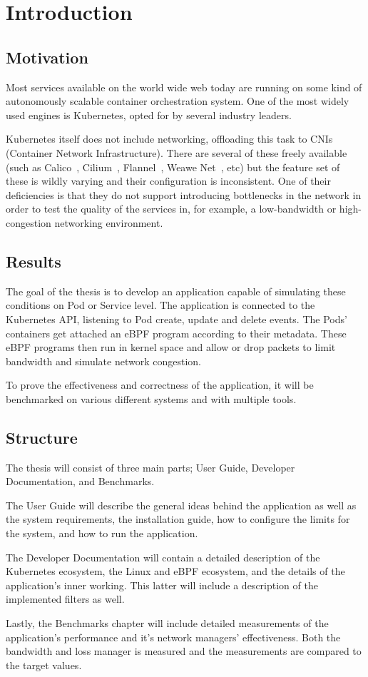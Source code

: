 \chapter{Introduction} %
\label{ch:intro}

\section{Motivation}
Most services available on the world wide web today are running on some kind of autonomously scalable container orchestration system. One of the most widely used engines is Kubernetes, opted for by several industry leaders.

Kubernetes itself does not include networking, offloading this task to CNIs (Container Network Infrastructure). There are several of these freely available (such as Calico~\cite{calico}, Cilium~\cite{cilium}, Flannel~\cite{flannel}, Weawe Net~\cite{weavenet}, etc) but the feature set of these is wildly varying and their configuration is inconsistent. One of their deficiencies is that they do not support introducing bottlenecks in the network in order to test the quality of the services in, for example, a low-bandwidth or high-congestion networking environment.

\section{Results}
The goal of the thesis is to develop an application capable of simulating these conditions on Pod or Service level. The application is connected to the Kubernetes API, listening to Pod create, update and delete events. The Pods' containers get attached an eBPF program according to their metadata. These eBPF programs then run in kernel space and allow or drop packets to limit bandwidth and simulate network congestion.

To prove the effectiveness and correctness of the application, it will be benchmarked on various different systems and with multiple tools.

\section{Structure}
The thesis will consist of three main parts; User Guide, Developer Documentation, and Benchmarks.
\bigbreak

The User Guide will describe the general ideas behind the application as well as the system requirements, the installation guide, how to configure the limits for the system, and how to run the application.
\bigbreak

The Developer Documentation will contain a detailed description of the Kubernetes ecosystem, the Linux and eBPF ecosystem, and the details of the application's inner working. This latter will include a description of the implemented filters as well.
\bigbreak

Lastly, the Benchmarks chapter will include detailed measurements of the application's performance and it's network managers' effectiveness. Both the bandwidth and loss manager is measured and the measurements are compared to the target values.